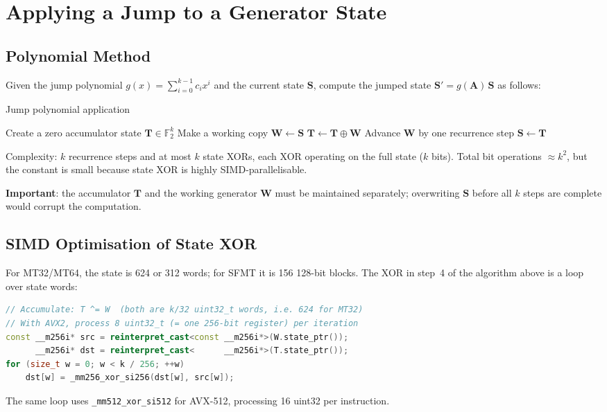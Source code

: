 \documentclass{article}
\begin{document}
\section{Applying a Jump to a Generator State}
\label{sec:apply}

\subsection{Polynomial Method}

Given the jump polynomial $g(x) = \sum_{i=0}^{k-1} c_i x^i$ and the current state
$\mathbf{S}$, compute the jumped state $\mathbf{S}' = g(\mathbf{A})\,\mathbf{S}$ as
follows:

\begin{algorithm}
\caption{Jump polynomial application}
\begin{algorithmic}[1]
\State Create a zero accumulator state $\mathbf{T} \in \mathbb{F}_2^k$
\State Make a working copy $\mathbf{W} \leftarrow \mathbf{S}$
   
    \State $\mathbf{T} \leftarrow \mathbf{T} \oplus \mathbf{W}$ 
  \EndIf
  \State Advance $\mathbf{W}$ by one recurrence step 
\EndFor
\State $\mathbf{S} \leftarrow \mathbf{T}$ 
\end{algorithmic}
\end{algorithm}

Complexity: $k$ recurrence steps and at most $k$ state XORs, each XOR operating on the full
state ($k$ bits).  Total bit operations $\approx k^2$, but the constant is small because
state XOR is highly SIMD-parallelisable.

\textbf{Important}: the accumulator $\mathbf{T}$ and the working generator $\mathbf{W}$
must be maintained separately; overwriting $\mathbf{S}$ before all $k$ steps are complete
would corrupt the computation.

\subsection{SIMD Optimisation of State XOR}

For MT32/MT64, the state is 624 or 312 words; for SFMT it is 156 128-bit blocks.  The XOR
in step~4 of the algorithm above is a loop over state words:
\begin{lstlisting}[language=C++, caption=SIMD-vectorised state XOR (AVX2 example)]
// Accumulate: T ^= W  (both are k/32 uint32_t words, i.e. 624 for MT32)
// With AVX2, process 8 uint32_t (= one 256-bit register) per iteration
const __m256i* src = reinterpret_cast<const __m256i*>(W.state_ptr());
      __m256i* dst = reinterpret_cast<      __m256i*>(T.state_ptr());
for (size_t w = 0; w < k / 256; ++w)
    dst[w] = _mm256_xor_si256(dst[w], src[w]);
\end{lstlisting}
The same loop uses \texttt{\_mm512\_xor\_si512} for AVX-512, processing 16 uint32 per
instruction.
\end{document}
